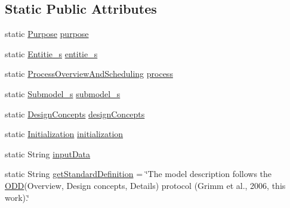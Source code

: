 \subsection*{Static Public Attributes}
\begin{DoxyCompactItemize}
\item 
static \hyperlink{classit_1_1isislab_1_1masonassisteddocumentation_1_1_o_d_d_1_1_purpose}{Purpose} \hyperlink{classit_1_1isislab_1_1masonassisteddocumentation_1_1_o_d_d_1_1_o_d_d_aa133a32d89f92614355144075edd77c5}{purpose}
\item 
static \hyperlink{classit_1_1isislab_1_1masonassisteddocumentation_1_1_o_d_d_1_1_entitie__s}{Entitie\-\_\-s} \hyperlink{classit_1_1isislab_1_1masonassisteddocumentation_1_1_o_d_d_1_1_o_d_d_a49fdc3fb727fa48b968c9db5110b02c5}{entitie\-\_\-s}
\item 
static \hyperlink{classit_1_1isislab_1_1masonassisteddocumentation_1_1_o_d_d_1_1_process_overview_and_scheduling}{Process\-Overview\-And\-Scheduling} \hyperlink{classit_1_1isislab_1_1masonassisteddocumentation_1_1_o_d_d_1_1_o_d_d_abd35b1ca191507b0bfea86b189679e0d}{process}
\item 
static \hyperlink{classit_1_1isislab_1_1masonassisteddocumentation_1_1_o_d_d_1_1_submodel__s}{Submodel\-\_\-s} \hyperlink{classit_1_1isislab_1_1masonassisteddocumentation_1_1_o_d_d_1_1_o_d_d_a828127e4a115a98ea6e6dba0a637c9ff}{submodel\-\_\-s}
\item 
static \hyperlink{classit_1_1isislab_1_1masonassisteddocumentation_1_1_o_d_d_1_1_design_concepts}{Design\-Concepts} \hyperlink{classit_1_1isislab_1_1masonassisteddocumentation_1_1_o_d_d_1_1_o_d_d_a70595ed3a3526edf3544088af9b945de}{design\-Concepts}
\item 
static \hyperlink{classit_1_1isislab_1_1masonassisteddocumentation_1_1_o_d_d_1_1_initialization}{Initialization} \hyperlink{classit_1_1isislab_1_1masonassisteddocumentation_1_1_o_d_d_1_1_o_d_d_a7bc1c0241113a34d5184d21cc92d4a0d}{initialization}
\item 
static String \hyperlink{classit_1_1isislab_1_1masonassisteddocumentation_1_1_o_d_d_1_1_o_d_d_a80d3020ab16a70890782d07321f84644}{input\-Data}
\item 
static String \hyperlink{classit_1_1isislab_1_1masonassisteddocumentation_1_1_o_d_d_1_1_o_d_d_a35a4a216476b294074ba15334011612e}{get\-Standard\-Definition} = \char`\"{}The model description follows the \hyperlink{classit_1_1isislab_1_1masonassisteddocumentation_1_1_o_d_d_1_1_o_d_d}{O\-D\-D}(Overview, Design concepts, Details) protocol (Grimm et al., 2006, this work).\char`\"{}
\end{DoxyCompactItemize}
